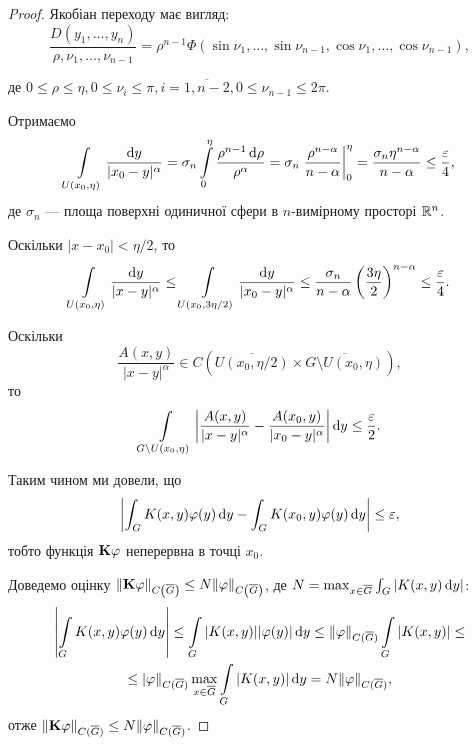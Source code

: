 \begin{proof}
	Якобіан переходу має вигляд:
	\begin{equation}
		\dfrac{D(y_1, \ldots, y_n)}{\rho, \nu_1, \ldots, \nu_{n - 1}} = \rho^{n - 1} \Phi(\sin \nu_1, \ldots, \sin \nu_{n - 1}, \cos \nu_1, \ldots, \cos \nu_{n - 1}),
	\end{equation}

	де $0 \le \rho \le \eta, 0 \le \nu_i \le \pi, i = \overline{1, n - 2}, 0 \le \nu_{n - 1} \le 2 \pi$. \medskip

	Отримаємо 
	\begin{equation}
		\Int_{U(x_0, \eta)} \dfrac{\diff y}{|x_0 - y|^\alpha} = \sigma_n \Int_0^\eta \dfrac{\rho^{n - 1} \diff \rho}{\rho^\alpha} = \sigma_n \left.\dfrac{\rho^{n - \alpha}}{n - \alpha}\right|_0^\eta = \dfrac{\sigma_n \eta^{n - \alpha}}{n - \alpha} \le \dfrac{\epsilon}{4},
	\end{equation}
	де $\sigma_n$ --- площа поверхні одиничної сфери в $n$-вимірному просторі $\RR^n$. \medskip

	Оскільки $|x - x_0| < \eta / 2$, то 
	\begin{equation}
		\Int_{U(x_0, \eta)} \dfrac{\diff y}{|x - y|^\alpha} \le \Int_{U(x_0, 3\eta/2)} \dfrac{\diff y}{|x_0 - y|^\alpha} \le \dfrac{\sigma_n}{n - \alpha} \left(\dfrac{3\eta}{2}\right)^{n - \alpha} \le \dfrac{\epsilon}{4}.
	\end{equation}

	Оскільки 
	\begin{equation}
		\frac{A(x, y)}{|x - y|^\alpha} \in C\left(\overline{U (x_0, \eta/2)}\times\overline{G \setminus U (x_0, \eta)}\right),
	\end{equation}
	то
	\begin{equation}
		\Int_{G \setminus U(x_0, \eta)} \left|\dfrac{A(x, y)}{|x - y|^\alpha} - \dfrac{A(x_0, y)}{|x_0 - y|^\alpha}\right| \diff y \le \dfrac{\epsilon}{2}.
	\end{equation}

	Таким чином ми довели, що 
	\begin{equation}
		\left| \int_G K(x, y) \phi(y) \diff y - \int_G K(x_0, y) \phi(y) \diff y \right| \le \epsilon,
	\end{equation}
	тобто функція $\bf{K}\phi$ неперервна в точці $x_0$. \medskip

	Доведемо оцінку $\|\bf{K}\phi\|_{C\left(\overline G\right)} \le N \|\phi\|_{C\left(\overline G\right)}$, де $N = \max_{x \in \overline G} \int_G |K(x, y) \diff y|$:
	\begin{multline}
		\left| \Int_G K(x, y) \phi(y) \diff y \right| \le \Int_G |K(x, y)| |\phi(y)| \diff y \le \|\phi\|_{C(\overline G)} \Int_G |K(x, y)| \le \\
		\le |\phi\|_{C(\overline G)} \Max_{x \in \overline G} \Int_G |K(x, y)| \diff y = N \|\phi\|_{C(\overline G)},
	\end{multline}
	отже $\| \bf{K}\phi \|_{C(\overline G)} \le N \|\phi\|_{C(\overline G)}$. \medskip


\end{proof}
